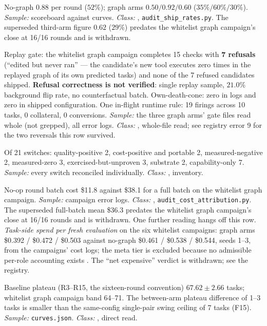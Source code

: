 \begin{description}[leftmargin=0pt,labelindent=0pt,labelsep=0pt,style=nextline,font=\normalfont,itemsep=6pt]
\item[\textbf{F10}\quad Ship rate.]
No-graph $0.88$ per round ($52\%$); graph arms $0.50/0.92/0.60$
($35\%/60\%/30\%$). \emph{Sample:} scoreboard against curves.
\emph{Class:} , \texttt{audit\_ship\_rates.py}. The
superseded third-arm figure $0.62$ ($29\%$) predates the whitelist
graph campaign's close at 16/16 rounds and is withdrawn.

\item[\textbf{F11}\quad Live record of the graph-only mechanisms.]
Replay gate: the whitelist graph campaign completes 15 checks
with \textbf{7 refusals} (``edited but never ran'' --- the candidate's new
tool executes zero times in the replayed graph of its own predicted tasks)
and none of the 7 refused candidates shipped. \textbf{Refusal correctness
is not verified}: single replay sample, $21.0\%$ background flip rate, no
counterfactual batch. Own-death-cone: zero in logs and zero in shipped
configuration. One in-flight runtime rule: 19 firings across 10 tasks, 0
collateral, 0 conversions. \emph{Sample:} the three graph arms' gate files
read whole (not grepped), all error logs. \emph{Class:} ,
whole-file read; see registry error 9 for the two reversals this row
survived.

\item[\textbf{F12}\quad Switch profit-and-loss.]
Of 21 switches: quality-positive 2, cost-positive and portable 2,
measured-negative 2, measured-zero 3, exercised-but-unproven 3, substrate
2, capability-only 7. \emph{Sample:} every switch reconciled individually.
\emph{Class:} , inventory.

\item[\textbf{F13}\quad Cost attribution.]
No-op round batch cost \$11.8 against \$38.1 for a full batch on the
whitelist graph campaign. \emph{Sample:} campaign error logs.
\emph{Class:} , \texttt{audit\_cost\_attribution.py}. The
superseded full-batch mean \$36.3 predates the whitelist graph
campaign's close at 16/16 rounds and is withdrawn. One
further reading hangs off this row. \emph{Task-side spend per fresh
evaluation} on the six whitelist campaigns: graph arms
\$0.392 / \$0.472 / \$0.503 against no-graph \$0.461 / \$0.538 /
\$0.544, seeds 1--3, from the campaigns' cost logs; the meta tier is
excluded because no admissible per-role accounting exists .
The ``net expensive'' verdict is withdrawn; see the registry.

\item[\textbf{F14}\quad Terminal scores do not separate.]
Baseline plateau (R3--R15, the sixteen-round convention)
$\mathbf{67.62 \pm 2.66}$ tasks; whitelist graph campaign band 64--71.
The between-arm plateau difference of 1--3 tasks is smaller than the
same-config single-pair swing ceiling of 7 tasks (F15). \emph{Sample:}
\texttt{curves.json}. \emph{Class:} , direct read.


\end{description}
